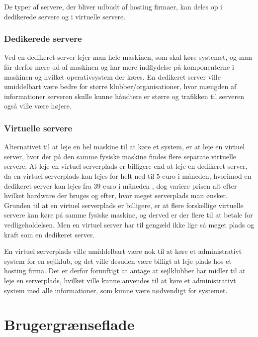 De typer af servere, der bliver udbudt af hosting firmaer, kan deles op i dedikerede servere og i virtuelle servere.


\subsubsection*{Dedikerede servere}

Ved en dedikeret server lejer man hele maskinen, som skal køre systemet, og man får derfor mere ud af maskinen og har mere
indflydelse på komponenterne i maskinen og hvilket operativsystem der køres. En dedikeret server ville umiddelbart være
bedre for større klubber/organisationer, hvor mængden af informationer serveren skulle kunne håndtere er større og
trafikken til serveren også ville være højere. \citep{server}


\subsubsection*{Virtuelle servere}

Alternativet til at leje en hel maskine til at køre et system, er at leje en virtuel server, hvor der på den samme
fysiske maskine findes flere separate virtuelle servere. At leje en virtuel serverplads er billigere end at leje en
dedikeret server, da en virtuel serverplads kan lejes for helt ned til 5 euro i måneden\citep{Virtuelserver}, hvorimod en
dedikeret server kan lejes fra 39 euro i måneden \citep{Dedikeretserver}, dog variere prisen alt efter hvilket hardware
der bruges og efter, hvor meget serverplads man ønsker. Grunden til at en virtuel serverplads er billigere, er at
flere forskellige virtuelle servere kan køre på samme fysiske maskine, og derved er der flere til at betale for
vedligeholdelsen. Men en virtuel server har til gengæld ikke lige så meget plads og kraft som en dedikeret
server.\citep{server}

En virtuel serverplads ville umiddelbart være nok til at køre et administrativt system for en sejlklub, og det ville
desuden være billigt at leje plads hos et hosting firma. Det er derfor fornuftigt at antage at sejlklubber har
midler til at leje en serverplads, hvilket ville kunne anvendes til at køre et administrativt system med alle
informationer, som kunne være nødvendigt for systemet.


\section{Brugergrænseflade}

